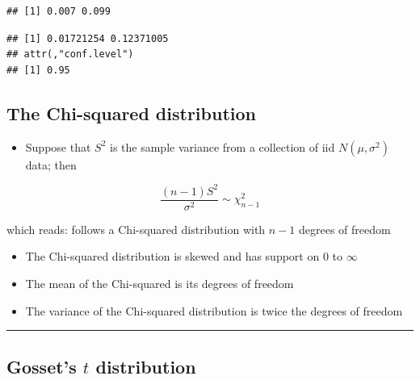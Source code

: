 \documentclass[]{article}
\newenvironment{Shaded}{\begin{snugshade}}{\end{snugshade}}
\newcommand{\DataTypeTok}[1]{\textcolor[rgb]{0.13,0.29,0.53}{#1}}
\newcommand{\FloatTok}[1]{\textcolor[rgb]{0.00,0.00,0.81}{#1}}
\newcommand{\KeywordTok}[1]{\textcolor[rgb]{0.13,0.29,0.53}{\textbf{#1}}}
\newcommand{\NormalTok}[1]{#1}
\newcommand{\OperatorTok}[1]{\textcolor[rgb]{0.81,0.36,0.00}{\textbf{#1}}}
\providecommand{\tightlist}{%
  \setlength{\itemsep}{0pt}\setlength{\parskip}{0pt}}
\begin{document}
\begin{verbatim}
## [1] 0.007 0.099
\end{verbatim}

\begin{Shaded}
\end{Shaded}

\begin{verbatim}
## [1] 0.01721254 0.12371005
## attr(,"conf.level")
## [1] 0.95
\end{verbatim}

\hypertarget{the-chi-squared-distribution}{%
\subsection{The Chi-squared
distribution}\label{the-chi-squared-distribution}}

\begin{itemize}
\tightlist
\item
  Suppose that \(S^2\) is the sample variance from a collection of iid
  \(N(\mu,\sigma^2)\) data; then
\end{itemize}

\[\frac{(n - 1) S^2}{\sigma^2} \sim \chi^2_{n-1}\]

which reads: follows a Chi-squared distribution with \(n-1\) degrees of
freedom

\begin{itemize}
\item
  The Chi-squared distribution is skewed and has support on \(0\) to
  \(\infty\)
\item
  The mean of the Chi-squared is its degrees of freedom
\item
  The variance of the Chi-squared distribution is twice the degrees of
  freedom
\end{itemize}

\begin{center}\rule{0.5\linewidth}{\linethickness}\end{center}

\hypertarget{gossets-t-distribution}{%
\subsection{\texorpdfstring{Gosset's \(t\)
distribution}{Gosset's t distribution}}\label{gossets-t-distribution}}
\end{document}
